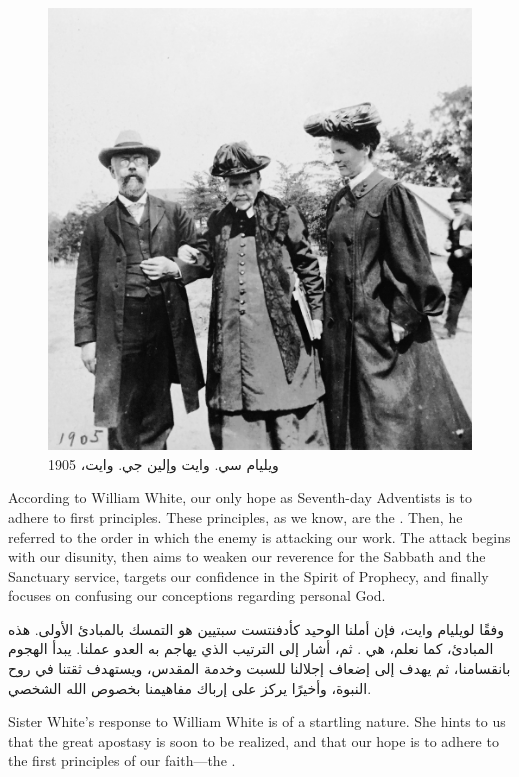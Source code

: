 \begin{figure}
    \centering
    \includegraphics[width=1\linewidth]{images/william-ellen-white-1905.jpg}
    \caption*{ويليام سي. وايت وإلين جي. وايت، 1905}
    \label{fig:w-e-white}
\end{figure}


According to William White, our only hope as Seventh-day Adventists is to adhere to first principles. These principles, as we know, are the . Then, he referred to the order in which the enemy is attacking our work. The attack begins with our disunity, then aims to weaken our reverence for the Sabbath and the Sanctuary service, targets our confidence in the Spirit of Prophecy, and finally focuses on confusing our conceptions regarding personal God.


وفقًا لويليام وايت، فإن أملنا الوحيد كأدفنتست سبتيين هو التمسك بالمبادئ الأولى. هذه المبادئ، كما نعلم، هي . ثم، أشار إلى الترتيب الذي يهاجم به العدو عملنا. يبدأ الهجوم بانقسامنا، ثم يهدف إلى إضعاف إجلالنا للسبت وخدمة المقدس، ويستهدف ثقتنا في روح النبوة، وأخيرًا يركز على إرباك مفاهيمنا بخصوص الله الشخصي.


Sister White’s response to William White is of a startling nature. She hints to us that the great apostasy is soon to be realized, and that our hope is to adhere to the first principles of our faith—the .


